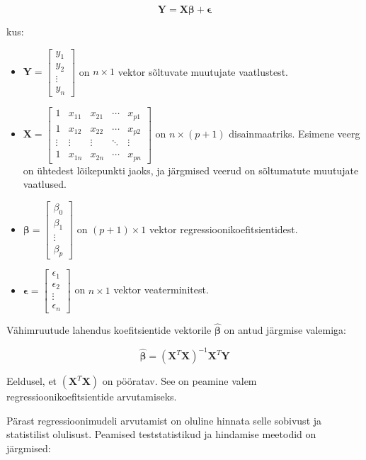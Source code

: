 \documentclass[
]{book}
\providecommand{\tightlist}{%
  \setlength{\itemsep}{0pt}\setlength{\parskip}{0pt}}
\begin{document}
\[\mathbf{Y} = \mathbf{X}\boldsymbol{\beta} + \boldsymbol{\epsilon}\]

kus:

\begin{itemize}
\tightlist
\item
  \(\mathbf{Y} = \begin{bmatrix} y_1 \\ y_2 \\ \vdots \\ y_n \end{bmatrix}\) on \(n \times 1\) vektor sõltuvate muutujate vaatlustest.
\item
  \(\mathbf{X} = \begin{bmatrix} 1 & x_{11} & x_{21} & \cdots & x_{p1} \\ 1 & x_{12} & x_{22} & \cdots & x_{p2} \\ \vdots & \vdots & \vdots & \ddots & \vdots \\ 1 & x_{1n} & x_{2n} & \cdots & x_{pn} \end{bmatrix}\) on \(n \times (p+1)\) disainmaatriks. Esimene veerg on ühtedest lõikepunkti jaoks, ja järgmised veerud on sõltumatute muutujate vaatlused.
\item
  \(\boldsymbol{\beta} = \begin{bmatrix} \beta_0 \\ \beta_1 \\ \vdots \\ \beta_p \end{bmatrix}\) on \((p+1) \times 1\) vektor regressioonikoefitsientidest.
\item
  \(\boldsymbol{\epsilon} = \begin{bmatrix} \epsilon_1 \\ \epsilon_2 \\ \vdots \\ \epsilon_n \end{bmatrix}\) on \(n \times 1\) vektor veaterminitest.
\end{itemize}

Vähimruutude lahendus koefitsientide vektorile \(\boldsymbol{\hat{\beta}}\) on antud järgmise valemiga:

\[\boldsymbol{\hat{\beta}} = (\mathbf{X}^T\mathbf{X})^{-1}\mathbf{X}^T\mathbf{Y}\]

Eeldusel, et \((\mathbf{X}^T\mathbf{X})\) on pööratav. See on peamine valem regressioonikoefitsientide arvutamiseks.

Pärast regressioonimudeli arvutamist on oluline hinnata selle sobivust ja statistilist olulisust. Peamised teststatistikud ja hindamise meetodid on järgmised:
\end{document}
